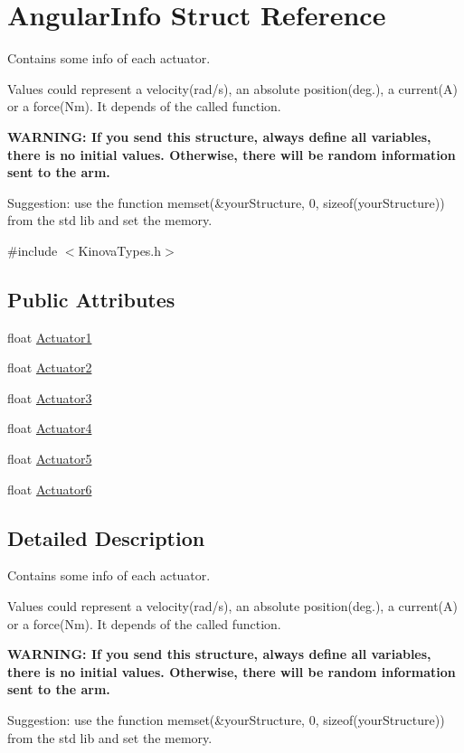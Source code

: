 \hypertarget{struct_angular_info}{\section{Angular\-Info Struct Reference}
\label{struct_angular_info}
}


\par
Contains some info of each actuator. \par
Values could represent a velocity(rad/s), an absolute position(deg.), a current(\-A) or a force(\-Nm). It depends of the called function. \par
{\bfseries W\-A\-R\-N\-I\-N\-G\-: If you send this structure, always define all variables, there is no initial values. Otherwise, there will be random information sent to the arm.} \par
Suggestion\-: use the function memset(\&your\-Structure, 0, sizeof(your\-Structure)) from the std lib and set the memory.  




{\ttfamily \#include $<$Kinova\-Types.\-h$>$}

\subsection*{Public Attributes}
\begin{DoxyCompactItemize}
\item 
float \hyperlink{struct_angular_info_a5fc555c085bddc82c33a3039fbc40932}{Actuator1}
\item 
float \hyperlink{struct_angular_info_ab7b9349eef239f9741d9c28a795e4c35}{Actuator2}
\item 
float \hyperlink{struct_angular_info_a30426eab94c82cfd3d697bbc8c506c2a}{Actuator3}
\item 
float \hyperlink{struct_angular_info_a46a1314c4846de6a495310b44fe5e0c3}{Actuator4}
\item 
float \hyperlink{struct_angular_info_a953c29d2481eb1c42c84e9c992d34dde}{Actuator5}
\item 
float \hyperlink{struct_angular_info_ab54771129d8a9e451c27942dd349340d}{Actuator6}
\end{DoxyCompactItemize}


\subsection{Detailed Description}
\par
Contains some info of each actuator. \par
Values could represent a velocity(rad/s), an absolute position(deg.), a current(\-A) or a force(\-Nm). It depends of the called function. \par
{\bfseries W\-A\-R\-N\-I\-N\-G\-: If you send this structure, always define all variables, there is no initial values. Otherwise, there will be random information sent to the arm.} \par
Suggestion\-: use the function memset(\&your\-Structure, 0, sizeof(your\-Structure)) from the std lib and set the memory. 




